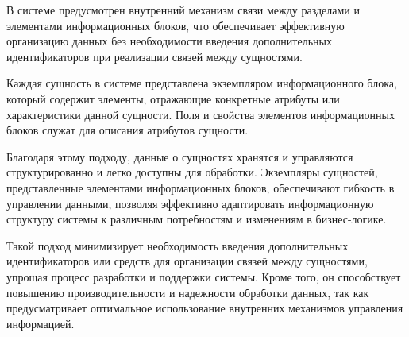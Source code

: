 В системе предусмотрен внутренний механизм связи между разделами и элементами информационных блоков, что обеспечивает эффективную организацию данных без необходимости введения дополнительных идентификаторов при реализации связей между сущностями.

Каждая сущность в системе представлена экземпляром информационного блока, который содержит элементы, отражающие конкретные атрибуты или характеристики данной сущности. Поля и свойства элементов информационных блоков служат для описания атрибутов сущности.

Благодаря этому подходу, данные о сущностях хранятся и управляются структурированно и легко доступны для обработки. Экземпляры сущностей, представленные элементами информационных блоков, обеспечивают гибкость в управлении данными, позволяя эффективно адаптировать информационную структуру системы к различным потребностям и изменениям в бизнес-логике.

Такой подход минимизирует необходимость введения дополнительных идентификаторов или средств для организации связей между сущностями, упрощая процесс разработки и поддержки системы. Кроме того, он способствует повышению производительности и надежности обработки данных, так как предусматривает оптимальное использование внутренних механизмов управления информацией.
